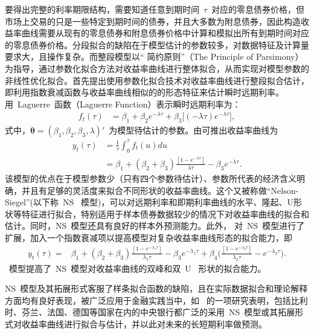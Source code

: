要得出完整的利率期限结构，需要知道任意到期时间~$\tau$~对应的零息债券价格，但市场上交易的只是一些特定到期时间的债券，并且大多数为附息债券，因此构造收益率曲线需要从现有的零息债券和附息债券价格中计算和模拟出所有到期时间对应的零息债券价格。分段拟合的缺陷在于模型估计的参数较多，对数据特征及计算量要求大，且操作复杂。而整段模型以`` 简约原则''（The Principle of Parsimony）为指导，通过参数化拟合方法对收益率曲线进行整体拟合，从而实现对模型参数的非线性优化拟合。首先提出使用参数化拟合技术对收益率曲线进行整段拟合估计，即利用指数衰减函数与收益率曲线相似的的形态特征来估计瞬时远期利率。\citeauthor{nelson1987parsimonious}~ 用~Laguerre~函数（Laguerre Function）表示瞬时远期利率为：
\begin{align}
  f_t(\tau) &= \beta_1 + \beta_2 e^{-\lambda \tau} + \beta_3 \big[(-\lambda \tau) e^{-\lambda \tau}\big],
\end{align}
式中，$\mathbf{\theta}=(\beta_1,\beta_2,\beta_3,\lambda)'$~为模型待估计的参数。由可推出收益率曲线为
\begin{align}\label{ns}
 y_t{(\tau)} &= \frac{1}{\tau}\int_0^{\tau} \! f_t{(u)} du  \nonumber \\
             &= \beta_1 + (\beta_2+\beta_3) \frac{[1 - e^{-\lambda \tau}]}{\lambda \tau}
                - \beta_3 e^{-\lambda \tau}.
\end{align}
该模型的优点在于模型参数少（只有四个参数待估计）、参数所代表的经济含义明确，并且有足够的灵活度来拟合不同形状的收益率曲线。这个又被称做``Nelson-Siegel''\tsm (以下称~NS~ 模型)，可以对远期利率和即期利率曲线的水平、隆起、U形状等特征进行拟合，特别适用于样本债券数据较少的情况下对收益率曲线的拟合和估计。同时，NS~模型还具有良好的样本外预测能力。此外， 对~NS~模型进行了扩展，加入一个指数衰减项以提高模型对复杂收益率曲线形态的拟合能力，即
\begin{align}
  y_t{(\tau)} = & \beta_1 + (\beta_2+\beta_3) \frac{[1 - e^{-\lambda_1 \tau}]}{\lambda_1 \tau}
                - \beta_3 e^{-\lambda_1 \tau}
               + \beta_4\Big(
                            \frac{[1 - e^{-\lambda_2 \tau}]}{\lambda_2 \tau}
                               - e^{-\lambda_2 \tau}
                           \Big).
\end{align}
\citeauthor{svensson1994estimating}~模型提高了~NS~模型对收益率曲线的双峰和双~U~ 形状的拟合能力。

NS~模型及其拓展形式客服了样条拟合函数的缺陷，且在实际数据拟合和理论解释方面均有良好表现，被广泛应用于金融实践当中，如~ 的一项研究表明，包括比利时、芬兰、法国、德国等国家在内的中央银行都广泛的采用~NS~模型或其拓展形式对收益率曲线进行拟合与估计，并以此对未来的长短期利率做预测。

